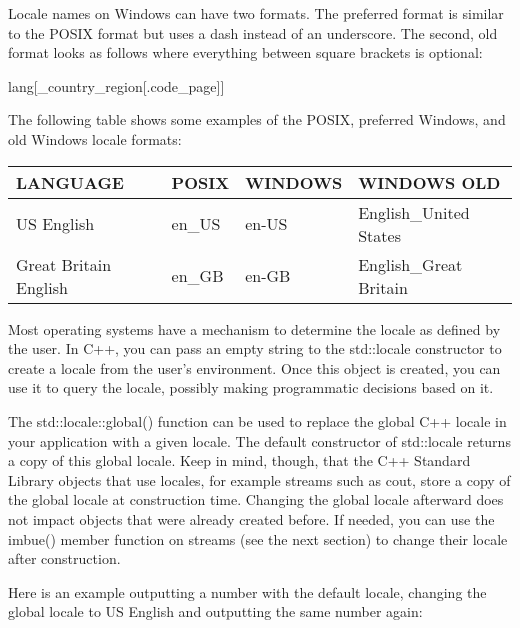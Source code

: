 Locale names on Windows can have two formats. The preferred format is similar to the POSIX format but uses a dash instead of an underscore. The second, old format looks as follows where everything between square brackets is optional:

\begin{cpp}
lang[_country_region[.code_page]]
\end{cpp}

The following table shows some examples of the POSIX, preferred Windows, and old Windows locale formats:

\begin{longtable}{|l|l|l|l|}
\hline
\textbf{LANGUAGE}     & \textbf{POSIX} & \textbf{WINDOWS} & \textbf{WINDOWS OLD}   \\ \hline
\endfirsthead
%
\endhead
%
US English            & en\_US         & en-US            & English\_United States \\ \hline
Great Britain English & en\_GB         & en-GB            & English\_Great Britain \\ \hline
\end{longtable}

Most operating systems have a mechanism to determine the locale as defined by the user. In C++, you can pass an empty string to the std::locale constructor to create a locale from the user’s environment. Once this object is created, you can use it to query the locale, possibly making programmatic decisions based on it.


The std::locale::global() function can be used to replace the global C++ locale in your application with a given locale. The default constructor of std::locale returns a copy of this global locale. Keep in mind, though, that the C++ Standard Library objects that use locales, for example streams such as cout, store a copy of the global locale at construction time. Changing the global locale afterward does not impact objects that were already created before. If needed, you can use the imbue() member function on streams (see the next section) to change their locale after construction.

Here is an example outputting a number with the default locale, changing the global locale to US English and outputting the same number again:

